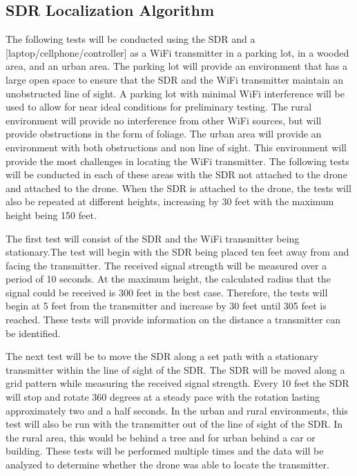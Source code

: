 \subsection{SDR Localization Algorithm}
The following tests will be conducted using the SDR and a [laptop/cellphone/controller] as a WiFi transmitter in a parking lot, in a wooded area, and an urban area. The parking lot will provide an environment that has a large open space to ensure that the SDR and the WiFi transmitter maintain an unobstructed line of sight. A parking lot with minimal WiFi interference will be used to allow for near ideal conditions for preliminary testing. The rural environment will provide no interference from other WiFi sources, but will provide obstructions in the form of foliage. The urban area will provide an environment with both obstructions and non line of sight. This environment will provide the most challenges in locating the WiFi transmitter. The following tests will be conducted in each of these areas with the SDR not attached to the drone and attached to the drone. When the SDR is attached to the drone, the tests will also be repeated at different heights, increasing by 30 feet with the maximum height being 150 feet.\par 
The first test will consist of the SDR and the WiFi transmitter being stationary.The test will begin with the SDR being placed ten feet away from and facing the transmitter. The received signal strength will be measured over a period of 10 seconds. At the maximum height, the calculated radius that the signal could be received is 300 feet in the best case. Therefore, the tests will begin at 5 feet from the transmitter and increase by 30 feet until 305 feet is reached. These tests will provide information on the distance a transmitter can be identified. \par 
The next test will be to move the SDR along a set path with a stationary transmitter within the line of sight of the SDR. The SDR will be moved along a grid pattern while measuring the received signal strength. Every 10 feet the SDR will stop and rotate 360 degrees at a steady pace with the rotation lasting approximately two and a half seconds. In the urban and rural environments, this test will also be run with the transmitter out of the line of sight of the SDR. In the rural area, this would be behind a tree and for urban behind a car or building. These tests will be performed multiple times and the data will be analyzed to determine whether the drone was able to locate the transmitter.\par 

